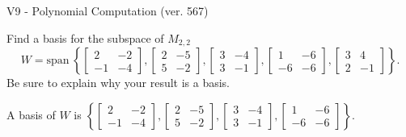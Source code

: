 \begin{exercise}
  \begin{exerciseTitle}V9 - Polynomial Computation (ver. 567)\end{exerciseTitle}
  \begin{exerciseStatement}
    Find a basis for the subspace of \(M_{2,2}\) 
\[W=\mathrm{span}\ \left\{\left[\begin{array}{cc}
2 & -2 \\
-1 & -4
\end{array}\right] , \left[\begin{array}{cc}
2 & -5 \\
5 & -2
\end{array}\right] , \left[\begin{array}{cc}
3 & -4 \\
3 & -1
\end{array}\right] , \left[\begin{array}{cc}
1 & -6 \\
-6 & -6
\end{array}\right] , \left[\begin{array}{cc}
3 & 4 \\
2 & -1
\end{array}\right]\right\}.\]
 Be sure to explain why your result is a basis.


  \end{exerciseStatement}
  \begin{exerciseAnswer}
   A basis of \(W\) is  \(\left\{\left[\begin{array}{cc}
2 & -2 \\
-1 & -4
\end{array}\right] , \left[\begin{array}{cc}
2 & -5 \\
5 & -2
\end{array}\right] , \left[\begin{array}{cc}
3 & -4 \\
3 & -1
\end{array}\right] , \left[\begin{array}{cc}
1 & -6 \\
-6 & -6
\end{array}\right]\right\}\).
  


  \end{exerciseAnswer}
\end{exercise}